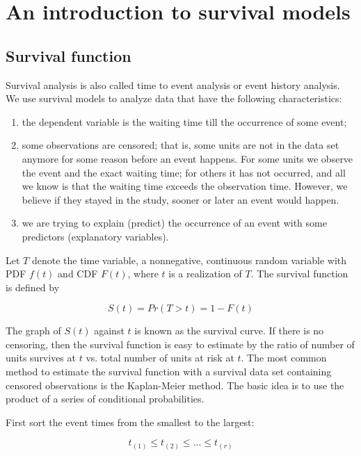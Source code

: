 \chapter{An introduction to survival models}

\section{Survival function}


Survival analysis is also called time to event analysis or event
history analysis.  We use survival models to analyze data that have the following characteristics:

\begin{enumerate}
\item the dependent variable is the waiting time till the occurrence of some event;
\item some observations are censored; that is, some units are not in the data set anymore for some reason before an event happens.  For some units we observe the event and the exact waiting time; for others it has not occurred, and all we know is that the waiting time exceeds the observation time.  However, we believe if they stayed in the study, sooner or later an event would happen.
\item we are trying to explain (predict) the occurrence of an event with some predictors (explanatory variables).
\end{enumerate}

Let $T$ denote the time variable, a nonnegative, continuous
random variable with PDF $f(t)$ and CDF $F(t)$, where $t$ is a
realization of $T$.  The survival function is defined by

\begin{equation}
S(t) = Pr(T>t) = 1-F(t)
\end{equation}

The graph of $S(t)$ against $t$ is known as the survival curve.  If
there is no censoring, then the survival function is easy to estimate
by the ratio of number of units survives at $t$ vs. total number of
units at risk at $t$.  The most common method to estimate the survival
function with a survival data set containing censored observations is
the Kaplan-Meier method.  The basic idea is to use the product of a series of conditional probabilities.

First sort the event times from the smallest to the largest:


\begin{equation}
t_{(1)} \le t_{(2)} \le ... \le t_{(r)}
\end{equation}


